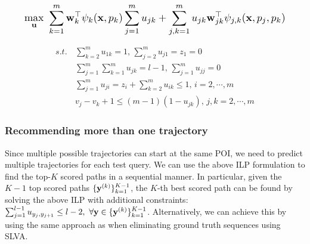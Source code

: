 \vspace{-.4em}
\begin{equation}
\label{eq:obj}
\resizebox{0.909\linewidth}{!}{$\displaystyle
\max_{\bu} ~\sum_{k=1}^m \w_k^\top \psi_k(\x, p_k) \sum_{j=1}^m u_{jk} +
            \sum_{j,k=1}^m u_{jk} \w_{jk}^\top \psi_{j, k}(\x, p_j, p_k)
$}
\end{equation}
%
\begin{small}
\vspace{-1.2em}
\begin{align}
s.t. \, 
& \sum_{k=2}^m u_{1k} = 1, \, \sum_{j=2}^m u_{j1} = z_1=0                   \label{eq:cons1} \\
& \sum_{j=1}^m \sum_{k=1}^m u_{jk} = l-1, \, \sum_{j=1}^m u_{jj}=0          \label{eq:cons2} \\
& \sum_{j=1}^m u_{ji} = z_i + \sum_{k=2}^m u_{ik} \le 1, \, i = 2,\cdots,m  \label{eq:cons3} \\
& v_j - v_k + 1 \le (m-1) (1-u_{jk}), \, j,k = 2,\cdots,m                   \label{eq:cons4}
\end{align}
\end{small}

\vspace{-1.3em}

\subsubsection{Recommending more than one trajectory}
Since multiple possible trajectories can start at the same POI, 
we need to predict multiple trajectories for each test query. 
We can use the above ILP formulation to find the top-$K$ scored paths in a sequential manner.
In particular, given the $K\!-\!1$ top scored paths $\{\mathbf{y}^{({k})}\}_{k=1}^{K-1}$,
the $K\!$-th best scored path can be found by solving the above ILP with additional constraints:
$\sum_{j=1}^{l-1} u_{y_j, y_{j+1}} \le l-2, ~\forall \mathbf{y} \in \{\mathbf{y}^{(k)}\}_{k=1}^{K-1}$.
Alternatively, we can achieve this by using the same approach as when eliminating ground truth sequences using SLVA.


